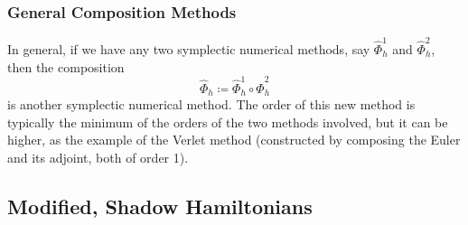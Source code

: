     \subsubsection{General Composition Methods}

      In general, if we have any two symplectic numerical methods, say $\hat{\Phi}_h^1$ and $\hat{\Phi}_h^2$, then the composition 
      \begin{equation}
        \hat{\Phi}_h \coloneqq \hat{\Phi}_h^1 \circ \hat{\Phi}_h^2
      \end{equation}
      is another symplectic numerical method. The order of this new method is typically the minimum of the orders of the two methods involved, but it can be higher, as the example of the Verlet method (constructed by composing the Euler and its adjoint, both of order 1). 

  \subsection{Modified, Shadow Hamiltonians}

